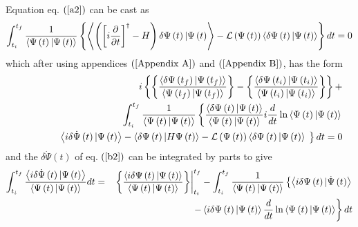 \documentclass[aps,preprint]{revtex4}
\begin{document}
Equation eq. $\left( \ref{a2}\right) $ can be cast as 
\begin{equation}
\int_{t_{i}}^{t_{f}}\frac{1}{\left\langle \Psi \left( t\right) |\Psi \left(
t\right) \right\rangle }\left\{ \left\langle \left( \left[ i\frac{\partial }{%
\partial t}\right] ^{\dagger }-H\right) \delta \Psi \left( t\right) |\Psi
\left( t\right) \right\rangle -\mathcal{L}\left( \Psi \left( t\right)
\right) \left\langle \delta \Psi \left( t\right) |\Psi \left( t\right)
\right\rangle \right\} dt=0
\end{equation}%
which after using appendices $\left( \ref{Appendix A}\right) $ and $\left( %
\ref{Appendix B}\right) $, has the form 
\begin{eqnarray}
&&i\left\{ \left\{ \frac{\left\langle \delta \Psi \left( t_{f}\right) |\Psi
\left( t_{f}\right) \right\rangle }{\left\langle \Psi \left( t_{f}\right)
|\Psi \left( t_{f}\right) \right\rangle }\right\} -\left\{ \frac{%
\left\langle \delta \Psi \left( t_{i}\right) |\Psi \left( t_{i}\right)
\right\rangle }{\left\langle \Psi \left( t_{i}\right) |\Psi \left(
t_{i}\right) \right\rangle }\right\} \right\} +  \notag \\
&&\qquad \qquad \qquad \qquad \qquad \int_{t_{i}}^{t_{f}}\frac{1}{%
\left\langle \Psi \left( t\right) |\Psi \left( t\right) \right\rangle }%
\left\{ \frac{\left\langle \delta \Psi \left( t\right) |\Psi \left( t\right)
\right\rangle }{\left\langle \Psi \left( t\right) |\Psi \left( t\right)
\right\rangle }i\frac{d}{dt}\ln \left\langle \Psi \left( t\right) |\Psi
\left( t\right) \right\rangle \right.  \notag \\
&&\qquad \left. \left\langle i\delta \dot{\Psi}\left( t\right) |\Psi \left(
t\right) \right\rangle -\left\langle \delta \Psi \left( t\right) |H\Psi
\left( t\right) \right\rangle -\mathcal{L}\left( \Psi \left( t\right)
\right) \left\langle \delta \Psi \left( t\right) |\Psi \left( t\right)
\right\rangle \overset{}{\left. {}\right. }\right\} dt=0  \label{b2}
\end{eqnarray}%
and the $\delta \dot{\Psi}\left( t\right) $ of eq. $\left( \ref{b2}\right) $
can be integrated by parts to give 
\begin{eqnarray}
\int_{t_{i}}^{t_{f}}\frac{\left\langle i\delta \dot{\Psi}\left( t\right)
|\Psi \left( t\right) \right\rangle }{\left\langle \Psi \left( t\right)
|\Psi \left( t\right) \right\rangle }dt &=&\left. \left\{ \frac{\left\langle
i\delta \Psi \left( t\right) |\Psi \left( t\right) \right\rangle }{%
\left\langle \Psi \left( t\right) |\Psi \left( t\right) \right\rangle }%
\right\} \right\vert _{t_{i}}^{t_{f}}-\int_{t_{i}}^{t_{f}}\frac{1}{%
\left\langle \Psi \left( t\right) |\Psi \left( t\right) \right\rangle }%
\left\{ \left\langle i\delta \Psi \left( t\right) |\dot{\Psi}\left( t\right)
\right\rangle \right.  \notag \\
&&\left. -\left\langle i\delta \Psi \left( t\right) |\Psi \left( t\right)
\right\rangle \frac{d}{dt}\ln \left\langle \Psi \left( t\right) |\Psi \left(
t\right) \right\rangle \right\} dt
\end{eqnarray}%
\end{document}
